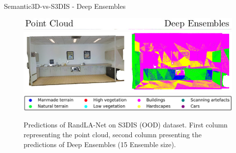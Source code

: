 \documentclass[aspectratio=169]{beamer}
\begin{document}
\begin{frame}{Semantic3D-vs-S3DIS - Deep Ensembles}
    \begin{figure}
        \centering
        \includegraphics[scale=0.5]{images/s3dis/top_legend_s3dis_DE.jpg}
        \includegraphics[scale=0.5]{images/s3dis/S3DIS_DE_output.jpg}
        \includegraphics[scale=0.25]{images/legend.jpg}
        \caption{Predictions of RandLA-Net on S3DIS (OOD) dataset. First column representing the point
        cloud, second column presenting the predictions of Deep Ensembles (15 Ensemble size).}
        \label{fig:s3dis_de_op}
    \end{figure}
\end{frame}
\end{document}
